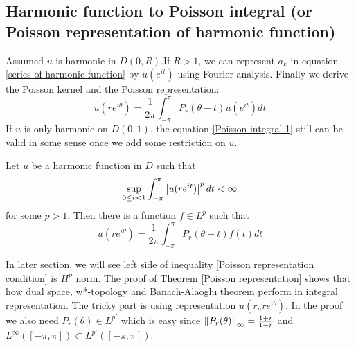 \subsection{Harmonic function to Poisson integral (or Poisson representation of harmonic function)}\label{harmonic function can be written as Poisson integral}
Assumed $u$ is harmonic in $D(0,R). $If $R>1$, we can represent $a_k$ in equation \eqref{series of harmonic function} by $u(e^{i t})$ using Fourier analysis. Finally we derive the Poisson kernel and the Poisson representation:
\begin{equation}
    u(re^{i\theta})=\frac{1}{2\pi}\int_{-\pi}^\pi{P_r(\theta-t)u(e^{i t})}d t\label{Poisson integral 1}
\end{equation}
If $u$ is only harmonic on $D(0,1)$, the equation \eqref{Poisson integral 1} still can be valid in some sense once we add some restriction on $u$.
\begin{theorem}\label{Poisson representation}
    Let $u$ be a harmonic function in $D$ such that
    \begin{equation}\label{Poisson representation condition}
        \sup_{0\leq r<1}{\int_{-\pi}^{\pi}\left\lvert u(re^{i t})\right\rvert^p d t}<\infty
    \end{equation}
    for some $p>1$. Then there is a function $f\in L^p$ such that
    \begin{equation}
        u(re^{i\theta})=\frac{1}{2\pi}\int_{-\pi}^\pi{P_r(\theta-t)f(t)}d t
    \end{equation}
\end{theorem}
In later section, we will see left side of inequality \eqref{Poisson representation condition} is $H^p$ norm. The proof of Theorem \ref{Poisson representation} shows
that how dual space, w*-topology and Banach-Alaoglu theorem perform in integral representation. The tricky part is using representation $u(r_nre^{i\theta})$.
In the proof we also need $P_r(\theta)\in L^{p'}$ which is easy since  $\left\lVert P_r(\theta)\right\rVert_\infty=\frac{1+r}{1-r}$ and $L^\infty([-\pi,\pi]) \subset L^{p'}([-\pi,\pi])$.\par


